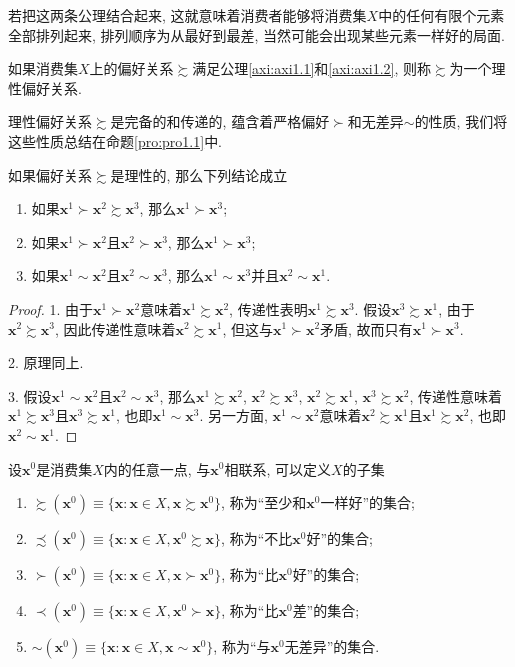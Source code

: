 \documentclass[cn, 12pt, math=mtpro2, bibstyle=apa, blue, twocol]{elegantbook}
\newcommand{\x}{\mathbf{x}}
\begin{document}
若把这两条公理结合起来, 这就意味着消费者能够将消费集$X$中的任何有限个元素全部排列起来, 排列顺序为从最好到最差, 当然可能会出现某些元素一样好的局面.
\begin{definition}[理性偏好关系]
如果消费集$X$上的偏好关系$\succsim$满足公理\ref{axi:axi1.1}和\ref{axi:axi1.2}, 则称$\succsim$为一个理性偏好关系.
\end{definition}
理性偏好关系$\succsim$是完备的和传递的, 蕴含着严格偏好$\succ$和无差异$\sim$的性质, 我们将这些性质总结在命题\ref{pro:pro1.1}中.
\begin{proposition}\label{pro:pro1.1}
  如果偏好关系$\succsim$是理性的, 那么下列结论成立
  \begin{enumerate}[\arabic*.]
    \item 如果$\x^1\succ\x^2\succsim\x^3$, 那么$\x^1\succ\x^3$;
    \item 如果$\x^1\succ\x^2$且$\x^2\succ\x^3$, 那么$\x^1\succ\x^3$;
    \item 如果$\x^1\sim\x^2$且$\x^2\sim\x^3$, 那么$\x^1\sim\x^3$并且$\x^2\sim \x^1$.
  \end{enumerate}
\end{proposition}
\begin{proof}
  1. 由于$\x^1\succ\x^2$意味着$\x^1\succsim \x^2$, 传递性表明$\x^1\succsim \x^3$. 假设$\x^3\succsim\x^1$, 由于$\x^2\succsim \x^3$, 因此传递性意味着$\x^2\succsim \x^1$, 但这与$\x^1\succ \x^2$矛盾, 故而只有$\x^1\succ\x^3$.

  2. 原理同上.

  3. 假设$\x^1\sim\x^2$且$\x^2\sim\x^3$, 那么$\x^1\succsim\x^2$, $\x^2\succsim\x^3$, $\x^2\succsim\x^1$, $\x^3\succsim\x^2$, 传递性意味着$\x^1\succsim\x^3$且$\x^3\succsim\x^1$, 也即$\x^1\sim\x^3$. 另一方面, $\x^1\sim \x^2$意味着$\x^2\succsim\x^1$且$\x^1\succsim\x^2$, 也即$\x^2\sim\x^1$.
\end{proof}
\begin{definition}
设$\x^0$是消费集$X$内的任意一点, 与$\x^0$相联系, 可以定义$X$的子集
\begin{enumerate}[label=\arabic*.]
  \item $\succsim(\x^0)\equiv \{\x: \x\in X, \x\succsim\x^0\}$, 称为“至少和$\x^0$一样好”的集合;
  \item $\precsim(\x^0)\equiv \{\x: \x\in X, \x^0\succsim\x\}$, 称为“不比$\x^0$好”的集合;
  \item $\succ(\x^0)\equiv \{\x: \x\in X, \x\succ\x^0\}$, 称为“比$\x^0$好”的集合;
  \item $\prec(\x^0)\equiv \{\x: \x\in X, \x^0\succ \x\}$, 称为“比$\x^0$差”的集合;
  \item $\sim(\x^0)\equiv\{\x: \x\in X, \x\sim \x^0\}$, 称为“与$\x^0$无差异”的集合.
\end{enumerate}
\end{definition}
\end{document}
